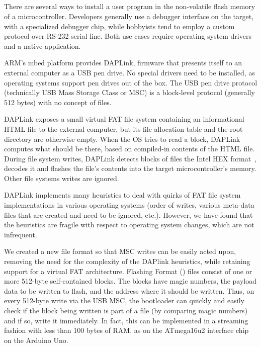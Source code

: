 \subsection{\UF}
\label{sec:uf2}

There are several ways to install a user program in the non-volatile flash memory
of a microcontroller. Developers generally use a debugger
interface on the target, with a specialized debugger chip,
while hobbyists tend to employ a custom protocol over RS-232 serial
line. Both use cases require operating system drivers and a native application.

ARM's mbed platform provides DAPLink, firmware that presents itself to an external computer
as a USB pen drive. No special drivers need to be installed, as operating
systems support pen drives out of the box. The USB pen drive protocol (technically USB Mass
Storage Class or MSC) is a block-level protocol (generally 512 bytes) with no
concept of files.

DAPLink exposes a small virtual FAT file system containing an informational HTML file
to the external computer,
but its file allocation table and the root directory are otherwise empty.
When the OS tries to read a block, DAPLink computes what should be there,
based on compiled-in contents of the HTML file.
During file system writes, DAPLink detects blocks of files the Intel HEX format~\cite{IntelHEX}, 
decodes it and flashes the file's contents into the target microcontroller's memory. 
Other file systems writes are ignored.

DAPLink implements many heuristics to deal with quirks of FAT file
system implementations in various operating systems (order of writes, various meta-data files
that are created and need to be ignored, etc.).  However, we have found that the
heuristics are fragile with respect to operating system changes, which are not infrequent.

We created a new file format so that MSC writes can be easily acted upon, removing
the need for the complexity of the DAPlink heuristics, while retaining support for
a virtual FAT architecture.
Flashing Format (\UF) files consist of one or more 512-byte self-contained blocks.
The blocks have magic numbers, the payload data to be written to flash,
and the address where it should be written.
Thus, on every 512-byte write via the USB MSC, the bootloader can quickly and easily
check if the block being written is part of a \UF file (by comparing magic numbers)
and if so, write it immediately. In fact, this can be implemented in a streaming
fashion with less than 100 bytes of RAM, as on the ATmega16u2 interface chip
on the Arduino Uno.

